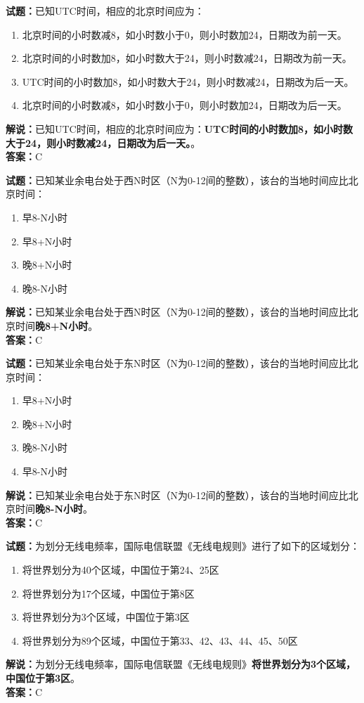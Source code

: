 \documentclass{ctexbook}
\begin{document}
\bigskip


\noindent\textbf{试题：}已知UTC时间，相应的北京时间应为：
\begin{enumerate}[leftmargin=3em]
\item 北京时间的小时数减8，如小时数小于0，则小时数加24，日期改为前一天。
\item 北京时间的小时数加8，如小时数大于24，则小时数减24，日期改为前一天。
\item UTC时间的小时数加8，如小时数大于24，则小时数减24，日期改为后一天。
\item 北京时间的小时数减8，如小时数小于0，则小时数加24，日期改为后一天。
\end{enumerate}
\noindent\textbf{解说：}已知UTC时间，相应的北京时间应为：\textbf{UTC时间的小时数加8，如小时数大于24，则小时数减24，日期改为后一天。}。\\\noindent\textbf{答案：}C


\bigskip


\noindent\textbf{试题：}已知某业余电台处于西N时区（N为0-12间的整数），该台的当地时间应比北京时间：
\begin{enumerate}[leftmargin=3em]
\item 早8-N小时
\item 早8+N小时
\item 晚8+N小时
\item 晚8-N小时
\end{enumerate}
\noindent\textbf{解说：}已知某业余电台处于西N时区（N为0-12间的整数），该台的当地时间应比北京时间\textbf{晚8+N小时}。\\\noindent\textbf{答案：}C




\bigskip


\noindent\textbf{试题：}已知某业余电台处于东N时区（N为0-12间的整数），该台的当地时间应比北京时间：
\begin{enumerate}[leftmargin=3em]
\item 早8+N小时
\item 晚8+N小时
\item 晚8-N小时
\item 早8-N小时
\end{enumerate}
\noindent\textbf{解说：}已知某业余电台处于东N时区（N为0-12间的整数），该台的当地时间应比北京时间\textbf{晚8-N小时}。\\\noindent\textbf{答案：}C



\bigskip


\noindent\textbf{试题：}为划分无线电频率，国际电信联盟《无线电规则》进行了如下的区域划分：
\begin{enumerate}[leftmargin=3em]
\item 将世界划分为40个区域，中国位于第24、25区
\item 将世界划分为17个区域，中国位于第8区
\item 将世界划分为3个区域，中国位于第3区
\item 将世界划分为89个区域，中国位于第33、42、43、44、45、50区
\end{enumerate}
\noindent\textbf{解说：}为划分无线电频率，国际电信联盟《无线电规则》\textbf{将世界划分为3个区域，中国位于第3区}。\\\noindent\textbf{答案：}C
\end{document}
